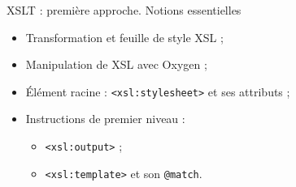 \documentclass{beamer}
\begin{document}
        \begin{frame}{XSLT : première approche. Notions essentielles}
            \Large
            \begin{itemize}
                \item Transformation et feuille de style XSL ;
                \bigskip
                \item Manipulation de XSL avec Oxygen ;
                \bigskip
                \item Élément racine : \texttt{<xsl:stylesheet>} et ses attributs ;
                \bigskip
                \item Instructions de premier niveau :
                \begin{itemize}
                \Large
                    \item \texttt{<xsl:output>} ;
                    \item \texttt{<xsl:template>} et son \texttt{@match}.
                \end{itemize}
            \end{itemize}
        \end{frame}
    
\end{document}
